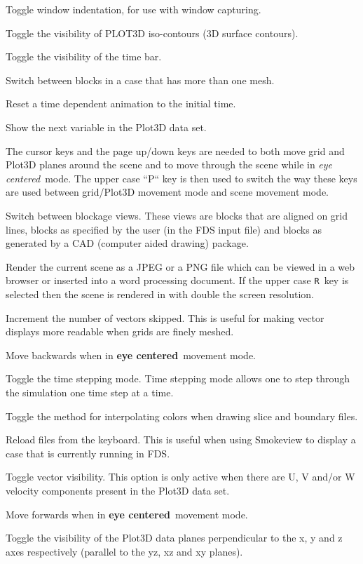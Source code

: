 \documentclass[11pt,twoside]{book}
\newcommand{\hitem}[1]{\item[{\bf #1} \hfill]}
\begin{document}
\hitem{h}Toggle window indentation, for
use with window capturing.

\hitem{i}Toggle the visibility of PLOT3D iso-contours (3D surface
contours).

\hitem{k}Toggle the visibility of the time bar.

\hitem{m}Switch between blocks in a case that has more than one
mesh.

\hitem{o,0}Reset a time dependent animation to the initial time.

\hitem{p}Show the next variable in the Plot3D data set.

\hitem{P}The cursor keys and the page up/down keys are needed to
both move grid and Plot3D planes around the scene and to move
through the scene while in {\em eye centered}\ mode.  The upper case
``P`` key is then used to switch the way these keys are used
between grid/Plot3D movement mode and scene movement mode.


\hitem{q}Switch between blockage views.  These views are
blocks that are aligned on grid lines, blocks as specified
by the user (in the FDS input file) and blocks as generated by
a CAD (computer aided drawing) package.

\hitem{r,R}Render the current scene as a JPEG or a PNG file
which can be viewed in a web browser or inserted into a
word processing document.  If the upper case {\tt R}\ key
is selected then the scene is rendered in with double the screen resolution.

\hitem{s}Increment the number of vectors skipped. This is useful
for making vector displays more readable when grids are finely
meshed.

\hitem{s}Move backwards when in {\bf eye centered}\ movement mode.

\hitem{t}Toggle the time stepping mode.  Time stepping mode allows one
to step through the simulation one time step at a time.

\hitem{T}Toggle the method for interpolating colors when drawing slice and boundary files.

\hitem{u}Reload files from the keyboard.  This is useful when using
Smokeview to display a case that is currently running in
FDS.

\hitem{v}Toggle vector visibility.  This option is only active
when there are U, V and/or W velocity components present in the
Plot3D data set.

\hitem{w}Move forwards when in {\bf eye centered}\ movement mode.

\hitem{x, y, z}Toggle the visibility of the Plot3D data planes
perpendicular to the x, y and z axes respectively (parallel to the
yz, xz and xy planes).
\end{document}
